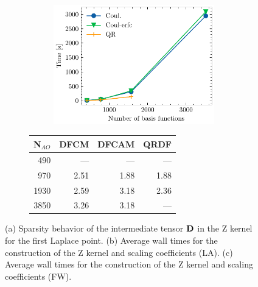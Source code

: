 \begin{figure}[htp]
\begin{subfigure}{\textwidth}
\begin{subfigure}{0.45\textwidth}
\centering
\includegraphics[width=\textwidth]{Pics/mp2_fw}
\end{subfigure}
\hfill
\begin{subtable}{0.45\textwidth}
\centering
\begin{tabular}{rrrr}
\hline
N$_{AO}$ & DFCM & DFCAM & QRDF \\
\hline 
490 & --- & --- & --- \\ 
970 & 2.51 & 1.88 & 1.88 \\ 
1930 & 2.59 & 3.18 & 2.36 \\ 
3850 & 3.26 & 3.18 & --- \\ 
 \hline
\end{tabular}
\end{subtable}
\caption{}
\label{fig:GS_ZSCALE_FW}
\end{subfigure}

\caption[Sparsity behavior of the intermediate tensors in the Z kernel.]{(a) Sparsity behavior of the intermediate tensor $\mathbf{D}$ in the Z kernel for the first Laplace point. (b) Average wall times for the construction of the Z kernel and scaling coefficients (LA). (c) Average wall times for the construction of the Z kernel and scaling coefficients (FW).}

\end{figure}